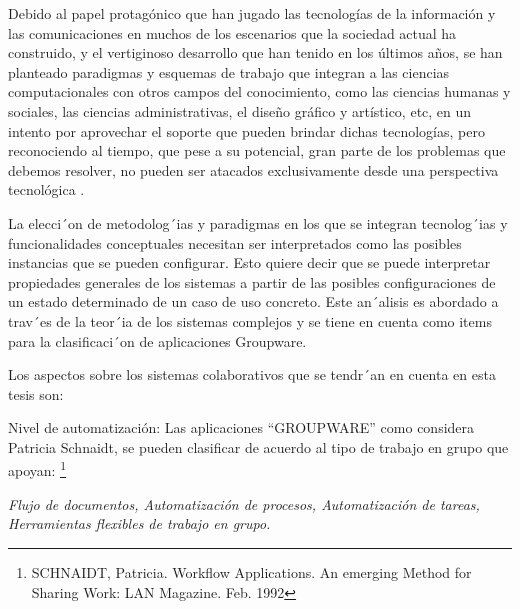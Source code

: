 Debido al papel protagónico que han
jugado las tecnologías de la información y
las comunicaciones en muchos de los
escenarios que la sociedad actual ha
construido, y el vertiginoso desarrollo que
han tenido en los últimos años, se han
planteado paradigmas y esquemas de
trabajo que integran a las ciencias
computacionales con otros campos del
conocimiento, como las ciencias humanas
y sociales, las ciencias administrativas, el
diseño gráfico y artístico, etc, en un
intento por aprovechar el soporte que
pueden brindar dichas tecnologías, pero
reconociendo al tiempo, que pese a su
potencial, gran parte de los problemas
que debemos resolver, no pueden ser
atacados exclusivamente desde una
perspectiva tecnológica \cite{cap1.2,cap1.3}. 

La elecci´on de metodolog´ias y paradigmas en los que se integran tecnolog´ias
y funcionalidades conceptuales necesitan ser interpretados como las posibles
instancias que se pueden configurar. Esto quiere decir que se puede interpretar
propiedades generales de los sistemas a partir de las posibles configuraciones
de un estado determinado de un caso de uso concreto. Este an´alisis es abordado
a trav´es de la teor´ia de los sistemas complejos y se tiene en cuenta como
items para la clasificaci´on de aplicaciones Groupware.


Los aspectos sobre los sistemas colaborativos que se tendr´an en cuenta en esta
tesis son:


Nivel de automatización: Las aplicaciones “GROUPWARE” como considera
Patricia Schnaidt, se pueden clasificar de acuerdo al tipo de trabajo en grupo
que apoyan: \footnote{SCHNAIDT, Patricia. Workflow Applications. An
emerging Method for Sharing Work: LAN Magazine. Feb. 1992}


\textit{Flujo de documentos, Automatización de procesos, Automatización de
tareas, Herramientas flexibles de trabajo en grupo.}

